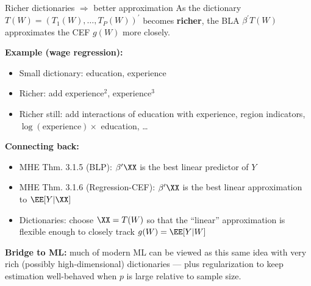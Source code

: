 \documentclass[compress, 8pt]{beamer}
\begin{document}
\begin{frame}{Richer dictionaries $\Rightarrow$ better approximation}
    As the dictionary $T(W) = (T_1(W), \dots, T_P(W))^\prime$ becomes \textbf{richer}, the BLA $\beta^\prime T(W)$ approximates the CEF $g(W)$ more closely.

    \vspace{2ex}
    \textbf{Example (wage regression):}
    \begin{itemize}
        \item Small dictionary: education, experience
        \item Richer: add $\text{experience}^2$, $\text{experience}^3$
        \item Richer still: add interactions of education with experience, region indicators, $\log(\text{experience}) \times$ education, \dots
    \end{itemize}

    \vspace{2ex}
    \textbf{Connecting back:}
    \begin{itemize}
        \item MHE Thm. 3.1.5 (BLP): $\beta^\prime \XX$ is the best linear predictor of $Y$
        \item MHE Thm. 3.1.6 (Regression-CEF): $\beta^\prime \XX$ is the best linear approximation to $\EE[Y \vert \XX]$
        \item Dictionaries: choose $\XX = T(W)$ so that the ``linear'' approximation is flexible enough to closely track $g(W) = \EE[Y \vert W]$
    \end{itemize}

    \vspace{2ex}
    \textbf{Bridge to ML:} much of modern ML can be viewed as this same idea with very rich (possibly high-dimensional) dictionaries — plus regularization to keep estimation well-behaved when $p$ is large relative to sample size.
\end{frame}
\end{document}
